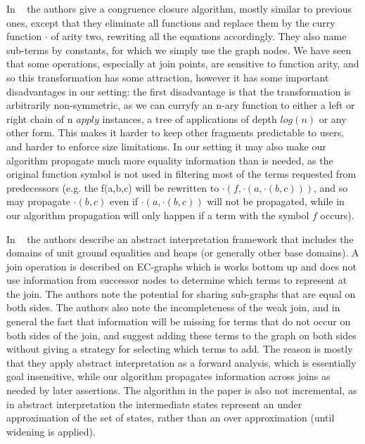 In ~\cite{NieuwenhuisOliveras03} the authors give a congruence closure algorithm, mostly similar to previous ones, 
except that they eliminate all functions and replace them by the curry function $\cdot$ of arity two, rewriting all the equations accordingly. They also name sub-terms by constants, for which we simply use the graph nodes. 
We have seen that some operations, especially at join points, are sensitive to function arity, and so this transformation has some attraction, however it has some important disadvantages in our setting:
the first disadvantage is that the transformation is arbitrarily non-symmetric, as we can curryfy an n-ary function to either a left or right chain of n $apply$ instances, a tree of applications of depth $log(n)$ or any other form. 
This makes it harder to keep other fragments predictable to users, and harder to enforce size limitations. In our setting it may also make our algorithm propagate much more equality information than is needed, 
as the original function symbol is not used in filtering most of the terms requested from predecessors (e.g. the \GFA{} f(a,b,c) will be rewritten to $\cdot(f,\cdot(a,\cdot(b,c)))$, and so may propagate $\cdot(b,c)$ even if $\cdot(a,\cdot(b,c))$ will not be propagated, while in our algorithm propagation will only happen if a term with the symbol $f$ occurs).

In ~\cite{ChangLeino2005} the authors describe an abstract interpretation framework that includes the domains of unit ground equalities and heaps (or generally other base domains). A join operation is described on EC-graphs which is works bottom up and does not use information from successor nodes to determine which terms to represent at the join.
The authors note the potential for sharing sub-graphs that are equal on both sides. The authors also note the incompleteness of the weak join, and in general the fact that information will be missing for terms that do not occur on both sides of the join, and suggest adding these terms to the graph on both sides without giving a strategy for selecting which terms to add. The reason is mostly that they apply abstract interpretation as a forward analysis, which is essentially goal insensitive, while our algorithm propagates information across joins as needed by later assertions. The algorithm in the paper is also not incremental, as in abstract interpretation the intermediate states represent an under approximation of the set of states, rather than an over approximation (until widening is applied).


